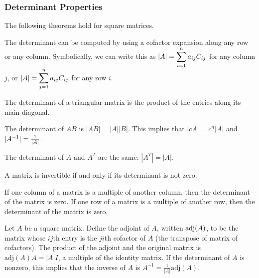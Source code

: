 \subsubsection{Determinant Properties}

The following theorems hold for square matrices.

\begin{theorem}
The determinant can be computed by using a cofactor expansion along any row or any column. Symbolically, we can write this as $\displaystyle |A| = \sum_{i=1}^n a_{ij} C_{ij}$ for any column $j$,  or $\displaystyle |A| = \sum_{j=1}^n a_{ij} C_{ij}$ for any row $i$.
\end{theorem}


\begin{theorem}\label{thm det triangular}
The determinant of a triangular matrix is the product of the entries along its main diagonal.
\end{theorem}

\begin{theorem}\label{thm det product}
The determinant of $AB$ is $|AB|=|A||B|$. This implies that $|cA|=c^n|A|$ and $|A^{-1}|=\frac{1}{|A|}$. 
\end{theorem}

\begin{theorem}\label{thm det transpose}
The determinant of $A$ and $A^T$ are the same: $|A^T| = |A|$.
\end{theorem}

\begin{theorem}\label{thm det zero}
A matrix is invertible if and only if its determinant is not zero.
\end{theorem}

\begin{theorem}\label{thm det multiple columns}
If one column of a matrix is a multiple of another column, then the determinant of the matrix is zero. 
If one row of a matrix is a multiple of another row, then the determinant of the matrix is zero. 
\end{theorem}

\begin{theorem}\label{thm adjoint}
Let $A$ be a square matrix. Define the adjoint of $A$, written $\operatorname{adj}(A)$, to be the matrix whose $ij$th entry is the $ji$th cofactor of $A$ (the transpose of matrix of cofactors).  
The product of the adjoint and the original matrix is $\text{adj}(A) A = |A|I$, a multiple of the identity matrix. 
If the determinant of $A$ is nonzero, this implies that the inverse of $A$ is $A^{-1}=\frac{1}{|A|}\text{adj}(A)$.
\end{theorem}




